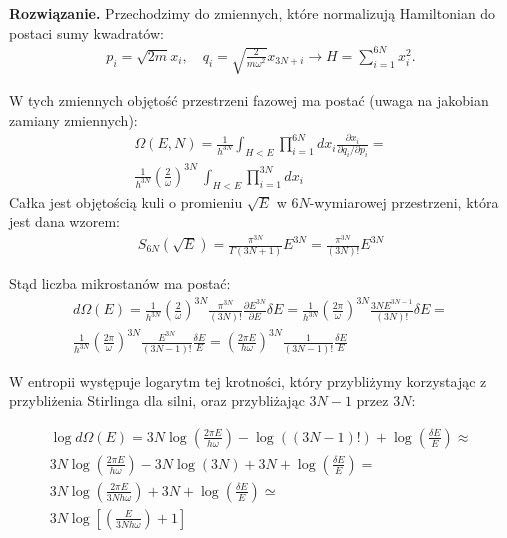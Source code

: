\documentclass[11pt,a4paper]{article}
\newenvironment{solution}{\vspace{1cm} \par\textbf{Rozwiązanie.} \vspace{1cm}}{}
\begin{document}
\begin{solution}
Przechodzimy do zmiennych, które normalizują Hamiltonian do postaci sumy kwadratów:
\begin{align*}
p_{i} = \sqrt{2m}x_{i}, \quad
q_{i} = \sqrt{\frac{2}{m\omega^2}}x_{3N+i} \to 
H = \sum_{i=1}^{6N} x_{i}^2.
\end{align*}

W tych zmiennych objętość przestrzeni fazowej ma postać 
(uwaga na jakobian zamiany zmiennych):
\begin{align*}
\Omega(E, N) = \frac{1}{h^{3N}}  \int_{H<E} \prod_{i=1}^{6N} dx_{i} \frac{\partial x_{i}}{\partial q_{i}/\partial p_{i}}   = \\
\frac{1}{h^{3N}} \left( \frac{2}{\omega} \right)^{3N} \
\int_{H<E} \prod_{i=1}^{3N} dx_{i} \,
\end{align*}
Całka jest objętością kuli o promieniu 
$\sqrt{E}$ w $6N$-wymiarowej przestrzeni, która jest dana wzorem:
\begin{align*}
S_{6N}(\sqrt{E}) = \frac{\pi^{3N}}{\Gamma(3N + 1)} E^{3N} =
\frac{\pi^{3N}}{(3N)!} E^{3N}
\end{align*}

Stąd liczba mikrostanów ma postać:
\begin{align*}
d\Omega(E) = \frac{1}{h^{3N}} 
\left( \frac{2}{\omega} \right)^{3N} \frac{\pi^{3N}}{(3N)!} 
\frac{\partial E^{3N}}{\partial E} \delta E =
\frac{1}{h^{3N}} 
\left( \frac{2\pi}{\omega} \right)^{3N} \frac{3NE^{3N-1}}{(3N)!} \delta E = \\
\frac{1}{h^{3N}} 
\left( \frac{2\pi}{\omega} \right)^{3N} \frac{E^{3N}}{(3N-1)!} \frac{\delta E}{E} = 
\left( \frac{2\pi E}{h\omega} \right)^{3N} \frac{1}{(3N-1)!} \frac{\delta E}{E}
\end{align*}

W entropii występuje logarytm tej krotności, który przybliżymy 
korzystając z przybliżenia Stirlinga dla silni, oraz
przybliżając $3N-1$ przez $3N$:

\begin{align*}
 \log d\Omega(E) = 3N \log\left( \frac{2\pi E}{h \omega} \right) - \log((3N-1)!) + \log\left( \frac{\delta E}{E} \right) \approx \\
  3N \log\left( \frac{2\pi E}{h \omega} \right) - 3N \log(3N) + 3N + \log\left( \frac{\delta E}{E} \right) = \\
  3N \log\left( \frac{2\pi E}{3N h \omega} \right) + 3N + \log\left( \frac{\delta E}{E} \right) \simeq \\
  3N \log \left[ \left( \frac{E}{3N h \omega} \right) + 1 \right]
\end{align*}


\end{solution}
\end{document}
